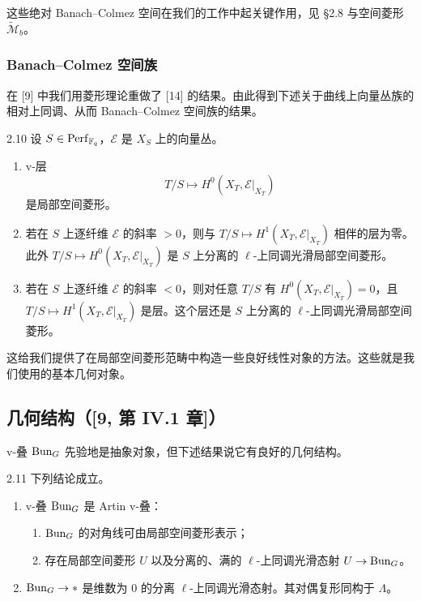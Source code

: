 这些绝对 Banach–Colmez 空间在我们的工作中起关键作用，见 §2.8 与空间菱形 $\widetilde{\mathcal M}_b$。

\subsubsection{Banach–Colmez 空间族}

在 [9] 中我们用菱形理论重做了 [14] 的结果。由此得到下述关于曲线上向量丛族的相对上同调、从而 Banach–Colmez 空间族的结果。

\begin{thm}{2.10}
设 $S\in\operatorname{Perf}_{\mathbb{F}_q}$，$\mathcal E$ 是 $X_S$ 上的向量丛。
\begin{enumerate}[label=(\arabic*),leftmargin=2.2em,itemsep=0.2em]
\item v-层
\[
T/S\mapsto H^0(X_T,\mathcal E|_{X_T})
\]
是局部空间菱形。
\item 若在 $S$ 上逐纤维 $\mathcal E$ 的斜率 $>0$，则与 $T/S\mapsto H^1(X_T,\mathcal E|_{X_T})$ 相伴的层为零。此外 $T/S\mapsto H^0(X_T,\mathcal E|_{X_T})$ 是 $S$ 上分离的 $\ell$-上同调光滑局部空间菱形。
\item 若在 $S$ 上逐纤维 $\mathcal E$ 的斜率 $<0$，则对任意 $T/S$ 有 $H^0(X_T,\mathcal E|_{X_T})=0$，且 $T/S\mapsto H^1(X_T,\mathcal E|_{X_T})$ 是层。这个层还是 $S$ 上分离的 $\ell$-上同调光滑局部空间菱形。
\end{enumerate}
\label{thm:a3-2-10}
\end{thm}

这给我们提供了在局部空间菱形范畴中构造一些良好线性对象的方法。这些就是我们使用的基本几何对象。

\subsection{几何结构（[9, 第 IV.1 章]）}

v-叠 $\operatorname{Bun}_G$ 先验地是抽象对象，但下述结果说它有良好的几何结构。

\begin{thm}{2.11}
下列结论成立。
\begin{enumerate}[label=(\arabic*),leftmargin=2.2em,itemsep=0.2em]
\item v-叠 $\operatorname{Bun}_G$ 是 Artin v-叠：
\begin{enumerate}[label=(\alph*),leftmargin=1.8em,itemsep=0.1em]
\item $\operatorname{Bun}_G$ 的对角线可由局部空间菱形表示；
\item 存在局部空间菱形 $U$ 以及分离的、满的 $\ell$-上同调光滑态射 $U\to\operatorname{Bun}_G$。
\end{enumerate}
\item $\operatorname{Bun}_G\to*$ 是维数为 $0$ 的分离 $\ell$-上同调光滑态射。其对偶复形同构于 $\Lambda$。
\end{enumerate}
\label{thm:a3-2-11}
\end{thm}

